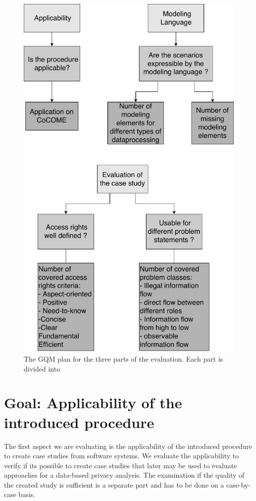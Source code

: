 \begin{figure}
\includegraphics[scale=.8, origin=c ]{logos/OverviewEval.pdf}
\caption{The GQM plan for the three parts of the evaluation. Each part is divided into }
\label{GQMPlan}
\end{figure}

\section{Goal: Applicability of the introduced procedure}
The first aspect we are evaluating is the applicability of the introduced procedure to create case studies from software systems. We evaluate the applicability to verify if its possible to create case studies that later may be used to evaluate approaches for a data-based privacy analysis. The examination if the quality of the created study is sufficient is a separate part and has to be done on a case-by-case basis.  
